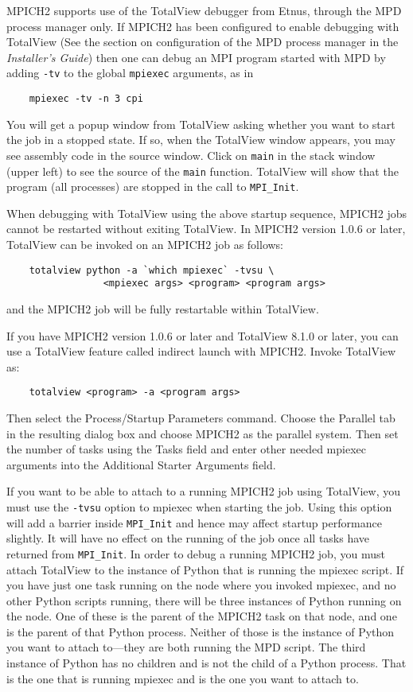 \documentclass[dvipdfm,11pt]{article}
\begin{document}
MPICH2 supports use of the TotalView debugger from Etnus, through the
MPD process manager only.  If 
MPICH2 has been configured to enable debugging with TotalView
(See the section on configuration of the MPD process manager in the
\emph{Installer's Guide}) then one can debug an MPI program started
with MPD by adding \texttt{-tv} to the global \texttt{mpiexec}
arguments, as in
\begin{verbatim}
    mpiexec -tv -n 3 cpi
\end{verbatim}
You will get a popup window from TotalView asking whether you want to
start the job in a stopped state.  If so,
when the TotalView window appears, you may see assembly code in the
source window.  Click on \texttt{main} in the stack window (upper left)
to see the source of the \texttt{main} function.  TotalView will show
that the program (all processes) are stopped in the call to
\texttt{MPI\_Init}. 

When debugging with TotalView using the above startup sequence, MPICH2
jobs cannot be restarted without exiting TotalView. In MPICH2 version
1.0.6 or later, TotalView can be invoked on an MPICH2 job as follows: 
\begin{verbatim}
    totalview python -a `which mpiexec` -tvsu \
                 <mpiexec args> <program> <program args>
\end{verbatim}
and the MPICH2 job will be fully restartable within TotalView.

If you have MPICH2 version 1.0.6 or later and TotalView 8.1.0 or later,
you can use a TotalView feature called indirect launch with
MPICH2. Invoke TotalView as: 
\begin{verbatim}
    totalview <program> -a <program args>
\end{verbatim}
Then select the Process/Startup Parameters command. Choose the
Parallel tab in the resulting dialog box and choose MPICH2 as the
parallel system. Then set the number of tasks using the Tasks field 
and enter other needed mpiexec arguments into the Additional
Starter Arguments field.  

If you want to be able to attach to a running MPICH2 job using
TotalView, you must use the \texttt{-tvsu} option to mpiexec when
starting the job. Using this option will add a barrier inside
\texttt{MPI\_Init} and hence may affect startup performance slightly. It
will have no effect on the running of the job once all tasks have
returned from \texttt{MPI\_Init}. In order to debug a running MPICH2
job, you must attach TotalView to the instance of Python that is
running the mpiexec script. If you have just one task running on the
node where you invoked mpiexec, and no other Python scripts running,
there will be three instances of Python running on the node. One of
these is the parent of the MPICH2 task on that node, and one is the
parent of that Python process. Neither of those is the instance of Python you
want to attach to---they are both running the MPD script. The third
instance of Python has no children and is not the child of a
Python process. That is the one that is running mpiexec and is the one you
want to attach to.
\end{document}
